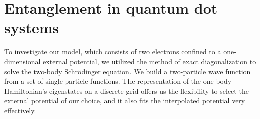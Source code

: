 \documentclass[twocolumn,superscriptaddress,unsortedaddress,
 amsmath,amssymb,
 aps,
]{revtex4-2}
\begin{document}
% 
% 

\section{Entanglement in quantum dot systems}
    To investigate our model, which consists of two electrons confined to a one-dimensional external potential, we utilized the method of exact diagonalization to solve the two-body Schrödinger equation.
    We build a two-particle wave function from a set of single-particle functions.
    The representation of the one-body Hamiltonian's eigenstates on a discrete grid offers us the flexibility to select the external potential of our choice, and it also fits the interpolated potential very effectively.
\end{document}
